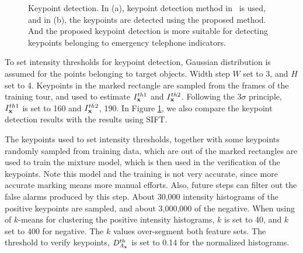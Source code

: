 \begin{figure}
\centering
{}
\caption[Keypoint detection comparison]{Keypoint detection. In (a), keypoint detection method in~\citep{o12} is used, and in (b), the keypoints are detected using the proposed method. And the proposed keypoint detection is more suitable for detecting keypoints belonging to emergency telephone indicators.}
\label{ex1:va}
\end{figure}

To set intensity thresholds for keypoint detection, Gaussian distribution is assumed for the points belonging to target objects. Width step $W$ set to 3, and $H$ set to 4. Keypoints in the marked rectangle are sampled from the frames of the training tour, and used to estimate $I^{th1}_{\bf{x}}$  and $I^{th2}_{\bf{x}}$.  Following the $3\sigma$ principle, $I^{th1}_{\bf{x}}$ is set to 160 and $I^{th2}_{\bf{x}}$, 190. In Figure \ref{ex1:va}, we also compare the keypoint detection results with the results using SIFT.

The keypoints used to set intensity thresholds, together with some keypoints randomly sampled from training data, which are out of the marked rectangles are used to train the mixture model, which is then used in the verification of the keypoints.
 Note this model and the training is not very accurate, since more accurate marking means more manual efforts. Also, future steps can filter out the false alarms produced by this step.  About 30,000 intensity histograms of the positive keypoints are sampled, and about 3,000,000 of the negative. When using of $k$-means for clustering the positive intensity histograms, $k$ is set to 40, and $k$ set to 400 for negative. The $k$ values over-segment both feature sets. The threshold to verify keypoints, $D^{th}_{A_{\bf{x}}}$ is set to 0.14 for the normalized histograms.


